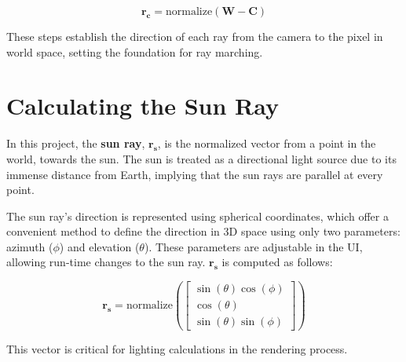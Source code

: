 \begin{equation}
   \mathbf{r_c} = \text{normalize}(\mathbf{W} - \mathbf{C})
\end{equation}

These steps establish the direction of each ray from the camera to the pixel in world space, setting the foundation for ray marching.

\section{Calculating the Sun Ray}
\label{Sun Ray}

In this project, the \textbf{sun ray}, $\mathbf{r_s}$, is the normalized vector from a point in the world, towards the sun. The sun is treated as a directional light source due to its immense distance from Earth, implying that the sun rays are parallel at every point.

The sun ray's direction is represented using spherical coordinates, which offer a convenient method to define the direction in 3D space using only two parameters: azimuth ($\phi$) and elevation ($\theta$). These parameters are adjustable in the UI, allowing run-time changes to the sun ray. $\mathbf{r_s}$ is computed as follows:

\begin{equation}
    \mathbf{r_s} = \text{normalize}\left( \begin{bmatrix} \sin(\theta) \cos(\phi) \\ \cos(\theta) \\ \sin(\theta) \sin(\phi) \end{bmatrix} \right)
\end{equation}

This vector is critical for lighting calculations in the rendering process.
